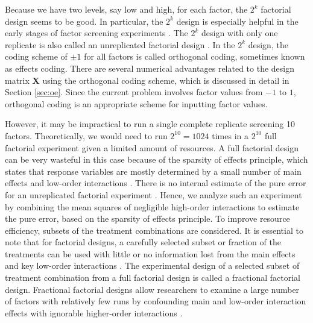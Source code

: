\documentclass[11pt]{article}
\begin{document}
Because we have two levels, say low and high, for each factor, the $2^k$ factorial design seems to be good. In particular, the $2^k$ design is especially helpful in the early stages of factor screening experiments \cite{bk:dae2}. The $2^k$ design with only one replicate is also called an unreplicated factorial design \cite{bk:dae1}. In the $2^k$ design, the coding scheme of $\pm 1$ for all factors is called orthogonal coding,  sometimes known as effects coding. There are several numerical advantages related to the design matrix $\pmb{X}$ using the orthogonal coding scheme, which is discussed in detail in Section \ref{sec:oe}. Since the current problem involves factor values from $-1$ to $1$, orthogonal coding is an appropriate scheme for inputting factor values.

However, it may be impractical to run a single complete replicate screening 10 factors. Theoretically, we would need to run $2^{10}=1024$ times in a $2^{10}$ full factorial experiment given a limited amount of resources. A full factorial design can be very wasteful in this case because of the sparsity of effects principle, which states that response variables are mostly determined by a small number of main effects and low-order interactions \cite{bk:dae1}. There is no internal estimate of the pure error for an unreplicated factorial experiment \cite{bk:dae1}. Hence, we analyze such an experiment by combining the mean squares of negligible high-order interactions to estimate the pure error, based on the sparsity of effects principle. To improve resource efficiency, subsets of the treatment combinations are considered. It is essential to note that for factorial designs, a carefully selected subset or fraction of the treatments can be used with little or no information lost from the main effects and key low-order interactions \cite{bk:dae1, bk:dae2}. The experimental design of a selected subset of treatment combination from a full factorial design is called a fractional factorial design. Fractional factorial designs allow researchers to examine a large number of factors with relatively few runs by confounding main and low-order interaction effects with ignorable higher-order interactions \cite{bk:dae1}. 
\end{document}
